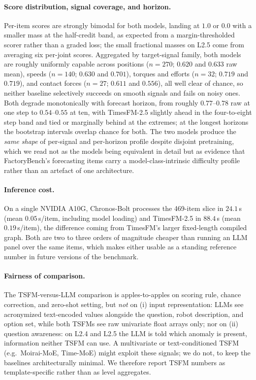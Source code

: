 \paragraph{Score distribution, signal coverage, and horizon.} Per-item scores are strongly bimodal for both models, landing at $1.0$ or $0.0$ with a smaller mass at the half-credit band, as expected from a margin-thresholded scorer rather than a graded loss; the small fractional masses on L2.5 come from averaging six per-joint scores. Aggregated by target-signal family, both models are roughly uniformly capable across positions ($n=270$; $0.620$ and $0.633$ raw mean), speeds ($n=140$; $0.630$ and $0.701$), torques and efforts ($n=32$; $0.719$ and $0.719$), and contact forces ($n=27$; $0.611$ and $0.556$), all well clear of chance, so neither baseline selectively succeeds on smooth signals and fails on noisy ones. Both degrade monotonically with forecast horizon, from roughly $0.77$--$0.78$ raw at one step to $0.54$--$0.55$ at ten, with TimesFM-2.5 slightly ahead in the four-to-eight step band and tied or marginally behind at the extremes; at the longest horizons the bootstrap intervals overlap chance for both. The two models produce the \emph{same shape} of per-signal and per-horizon profile despite disjoint pretraining, which we read not as the models being equivalent in detail but as evidence that FactoryBench's forecasting items carry a model-class-intrinsic difficulty profile rather than an artefact of one architecture.

\paragraph{Inference cost.} On a single NVIDIA A10G, Chronos-Bolt processes the 469-item slice in $24.1$\,s (mean $0.05$\,s/item, including model loading) and TimesFM-2.5 in $88.4$\,s (mean $0.19$\,s/item), the difference coming from TimesFM's larger fixed-length compiled graph. Both are two to three orders of magnitude cheaper than running an LLM panel over the same items, which makes either usable as a standing reference number in future versions of the benchmark.

\paragraph{Fairness of comparison.} The TSFM-versus-LLM comparison is apples-to-apples on scoring rule, chance correction, and zero-shot setting, but \emph{not} on (i) input representation: LLMs see acronymized text-encoded values alongside the question, robot description, and option set, while both TSFMs see raw univariate float arrays only; nor on (ii) question awareness: on L2.4 and L2.5 the LLM is told which anomaly is present, information neither TSFM can use. A multivariate or text-conditioned TSFM (e.g.\ Moirai-MoE, Time-MoE) might exploit these signals; we do not, to keep the baselines architecturally minimal. We therefore report TSFM numbers as template-specific rather than as level aggregates.

